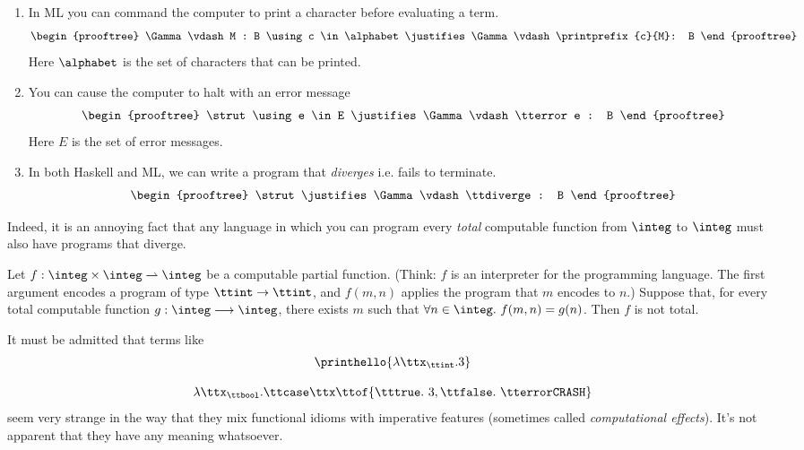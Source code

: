\documentclass[runningheads,12pt]{llncs}
\begin{document}
\begin{enumerate}\item 
 In ML you can command the computer to print a character
  before evaluating a term.
  \begin{displaymath}
    \begin{prooftree}
      \Gamma \vdash M : B \using c \in \alphabet \justifies \Gamma
      \vdash \printprefix{c}{M}: B
    \end{prooftree}
  \end{displaymath}
  Here $\alphabet$ is the set of characters that can be printed.
\item  You can cause the computer to halt with an error message
  \begin{displaymath}
    \begin{prooftree}
      \strut \using e \in E \justifies \Gamma \vdash \tterror e : B
    \end{prooftree}
  \end{displaymath}
  Here $E$ is the set of error messages. 
\item In both Haskell and ML, we
  can write a program that \emph{diverges} i.e. fails to terminate.
  \begin{displaymath}
    \begin{prooftree}
      \strut \justifies \Gamma \vdash \ttdiverge : B
    \end{prooftree}
  \end{displaymath}
\end{enumerate}

Indeed, it is an annoying fact that any language in which you can program every \emph{total} computable function from $\integ$ to $\integ$ must also have programs that diverge.
\begin{proposition}
  Let $f : \integ \times \integ \rightharpoonup \integ$ be a computable partial function.   {\small(Think: $f$ is an interpreter for the programming language.  The first argument encodes a program of type $\ttint \rightarrow \ttint$, and $f(m,n)$ applies the program that $m$ encodes to $n$.)}  Suppose that, for every total computable function $g : \integ \longrightarrow \integ$, there exists $m$ such that $\forall n \in \integ.\ f(m,n)=g(n)$.   Then $f$ is not total.
\end{proposition}


It must be admitted that terms like
\begin{displaymath}
  \begin{array}{c}
    \printhello{ \lambda \ttx_{\ttint}. 3 } \\ \\
    \lambda \ttx_{\ttbool}. \ttcase \ttx \ttof \{ \tttrue.\ 3, \ttfalse.\ \tterror \mathtt{CRASH} \}
  \end{array}
\end{displaymath}
seem very strange in the way that they mix functional idioms with imperative features (sometimes called \emph{computational effects}).  It's not apparent that they have any meaning whatsoever.  
\end{document}
